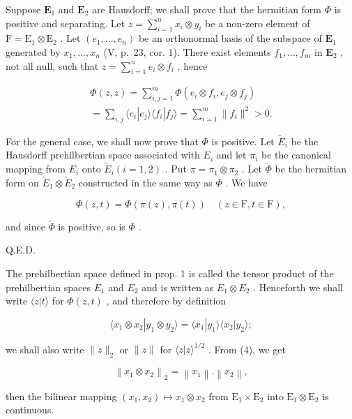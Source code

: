 Suppose \(\mathbf{E}_1\) and \(\mathbf{E}_2\) are Hausdorff; we shall prove that the hermitian form \(\Phi\) is positive and separating. Let \(z = \sum_{i=1}^{n} x_i \otimes y_i\) be a non-zero element of \(\mathrm{F} = \mathrm{E}_1 \otimes \mathrm{E}_2\) . Let \((e_1, ..., e_n)\) be an orthonormal basis of the subspace of \(\mathbf{E}_1\) generated by \(x_1, ..., x_n\) (V, p.~23, cor. 1). There exist elements \(f_1, ..., f_m\) in \(\mathbf{E}_2\) , not all null, such that \(z = \sum_{i=1}^{n} e_i \otimes f_i\) , hence

\[
\begin{array}{l} \Phi (z, z) = \sum_ {i, j = 1} ^ {m} \Phi (e _ {i} \otimes f _ {i}, e _ {j} \otimes f _ {j}) \\ = \sum_ {i, j} \langle e _ {i} | e _ {j} \rangle \langle f _ {i} | f _ {j} \rangle = \sum_ {i = 1} ^ {m} \| f _ {i} \| ^ {2} > 0. \end{array}
\]

For the general case, we shall now prove that \(\Phi\) is positive. Let \(\tilde{E}_{i}\) be the Hausdorff prehilbertian space associated with \(E_{i}\) and let \(\pi_{i}\) be the canonical mapping from \(E_{i}\) onto \(\tilde{E}_{i} (i = 1, 2)\) . Put \(\pi = \pi_{1} \otimes \pi_{2}\) . Let \(\tilde{\Phi}\) be the hermitian form on \(\tilde{E}_{1} \otimes \tilde{E}_{2}\) constructed in the same way as \(\Phi\) . We have

\[
\Phi (z, t) = \Phi (\pi (z), \pi (t)) \quad (z \in \mathrm{F}, t \in \mathrm{F}),
\]

and since \(\tilde{\Phi}\) is positive, so is \(\Phi\) .

Q.E.D.

The prehilbertian space defined in prop. 1 is called the tensor product of the prehilbertian spaces \(E_{1}\) and \(E_{2}\) and is written as \(E_{1} \otimes E_{2}\) . Henceforth we shall write \(\langle z|t\rangle\) for \(\Phi(z,t)\) , and therefore by definition

\[
\langle x _ {1} \otimes x _ {2} | y _ {1} \otimes y _ {2} \rangle = \langle x _ {1} | y _ {1} \rangle \langle x _ {2} | y _ {2} \rangle ;\tag{4}
\]

we shall also write \(\| z\| _2\) or \(\| z\|\) for \(\langle z|z\rangle^{1 / 2}\) . From (4), we get

\[
\left\| x _ {1} \otimes x _ {2} \right\| _ {2} = \left\| x _ {1} \right\|. \left\| x _ {2} \right\|,\tag{5}
\]

then the bilinear mapping \((x_{1}, x_{2}) \mapsto x_{1} \otimes x_{2}\) from \(\mathrm{E}_1 \times \mathrm{E}_2\) into \(\mathrm{E}_1 \otimes \mathrm{E}_2\) is continuous.

